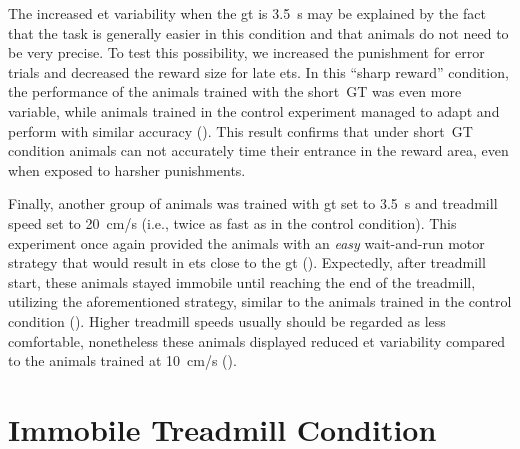 The increased \gls{et} variability when the \gls{gt} is 3.5~s may be explained by the fact that the task is generally easier in this condition and that animals do not need to be very precise.
To test this possibility, we increased the punishment for error trials and decreased the reward size for late \glspl{et}.
In this ``sharp reward'' condition, the performance of the animals trained with the short~GT was even more variable, while animals trained in the control experiment managed to adapt and perform with similar accuracy ().
This result confirms that under short~GT condition animals can not accurately time their entrance in the reward area, even when exposed to harsher punishments.
\par
Finally, another group of animals was trained with \gls{gt} set to 3.5~s and treadmill speed set to 20~cm/s (i.e., twice as fast as in the control condition).
This experiment once again provided the animals with an \textit{easy} wait-and-run motor strategy that would result in \glspl{et} close to the \gls{gt} ().
Expectedly, after treadmill start, these animals stayed immobile until reaching the end of the treadmill, utilizing the aforementioned strategy, similar to the animals trained in the control condition ().
Higher treadmill speeds usually should be regarded as less comfortable, nonetheless these animals displayed reduced \gls{et} variability compared to the animals trained at 10~cm/s ().


\section[Immobile Condition]{Immobile Treadmill Condition}
\label{ch:time:immobile}


